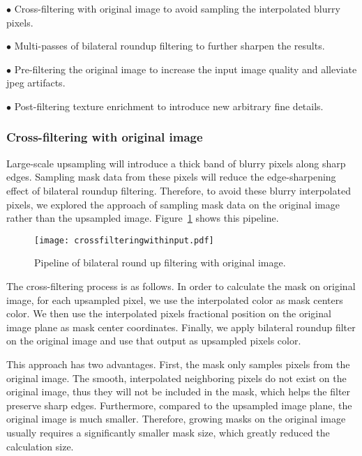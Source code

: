 $\bullet$ Cross-filtering with original image to avoid sampling the interpolated blurry pixels.

$\bullet$ Multi-passes of bilateral roundup filtering to further sharpen the results.

$\bullet$ Pre-filtering the original image to increase the input image quality and alleviate jpeg artifacts.

$\bullet$ Post-filtering texture enrichment to introduce new arbitrary fine details.

\subsubsection{Cross-filtering with original image}\label{Cross-filtering with original image}
Large-scale upsampling will introduce a thick band of blurry pixels along sharp edges. Sampling mask data from these pixels will reduce the edge-sharpening effect of bilateral roundup filtering. Therefore, to avoid these blurry interpolated pixels, we explored the approach of sampling mask data on the original image rather than the upsampled image. Figure~\ref{fig:BrndupCrossFiltering} shows this pipeline.

\begin{figure}[htbp]\centering
\texttt{[image: crossfilteringwithinput.pdf]}
\caption{Pipeline of bilateral round up filtering with original image.}
\label {fig:BrndupCrossFiltering}
\end{figure}

The cross-filtering process is as follows. In order to calculate the mask on original image, for each upsampled pixel, we use the interpolated color as mask center\textquotesingle s color. We then use the interpolated pixel\textquotesingle s fractional position on the original image plane as mask center coordinates. Finally, we apply bilateral roundup filter on the original image and use that output as upsampled pixel\textquotesingle s color.

This approach has two advantages. First, the mask only samples pixels from the original image. The smooth, interpolated neighboring pixels do not exist on the original image, thus they will not be included in the mask, which helps the filter preserve sharp edges. Furthermore, compared to the upsampled image plane, the original image is much smaller. Therefore, growing masks on the original image usually requires a significantly smaller mask size, which greatly reduced the calculation size.


